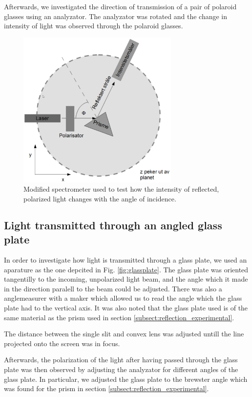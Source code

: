 \documentclass[11pt,a4paper, twocolumn]{article}
\begin{document}
      Afterwards, we investigated the direction of transmission of a pair of polaroid glasses using an analyzator. The analyzator was rotated and the change in intensity of light was observed through the polaroid glasses.

    \begin{figure}[H]
      \center
      \includegraphics[width=8cm]{scripts/figs/modified_spectrometer.png}
      \caption{Modified spectrometer used to test how the intensity of reflected, polarized light changes with the angle of incidence.}
      \label{fig:mod_spectro}
    \end{figure}

  \subsection{Light transmitted through an angled glass plate}

    In order to investigate how light is transmitted through a glass plate, we used an aparature as the one depcited in Fig. \ref{fig:glassplate}. The glass plate was oriented tangentilly to the incoming, unpolarized light beam, and the angle which it made in the direction paralell to the beam could be adjusted. There was also a anglemeasurer with a maker which allowed us to read the angle which the glass plate had to the vertical axis. It was also noted that the glass plate used is of the same material as the prism used in section \ref{subsect:reflection_experimental}.

    The distance between the single slit and convex lens was adjusted untill the line projected onto the screen was in focus.

    Afterwards, the polarization of the light after having passed through the glass plate was then observed by adjusting the analyzator for different angles of the glass plate. In particular, we adjusted the glass plate to the brewster angle which was found for the prism in section \ref{subsect:reflection_experimental}.
\end{document}
